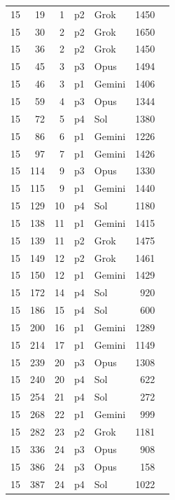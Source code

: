 \begin{longtable}{r r r l l r L{2.3in}}
15 & 19 & 1 & p2 & Grok & 1450 &  \\
15 & 30 & 2 & p2 & Grok & 1650 &  \\
15 & 36 & 2 & p2 & Grok & 1450 &  \\
15 & 45 & 3 & p3 & Opus & 1494 &  \\
15 & 46 & 3 & p1 & Gemini & 1406 &  \\
15 & 59 & 4 & p3 & Opus & 1344 &  \\
15 & 72 & 5 & p4 & Sol & 1380 &  \\
15 & 86 & 6 & p1 & Gemini & 1226 &  \\
15 & 97 & 7 & p1 & Gemini & 1426 &  \\
15 & 114 & 9 & p3 & Opus & 1330 &  \\
15 & 115 & 9 & p1 & Gemini & 1440 &  \\
15 & 129 & 10 & p4 & Sol & 1180 &  \\
15 & 138 & 11 & p1 & Gemini & 1415 &  \\
15 & 139 & 11 & p2 & Grok & 1475 &  \\
15 & 149 & 12 & p2 & Grok & 1461 &  \\
15 & 150 & 12 & p1 & Gemini & 1429 &  \\
15 & 172 & 14 & p4 & Sol & 920 &  \\
15 & 186 & 15 & p4 & Sol & 600 &  \\
15 & 200 & 16 & p1 & Gemini & 1289 &  \\
15 & 214 & 17 & p1 & Gemini & 1149 &  \\
15 & 239 & 20 & p3 & Opus & 1308 &  \\
15 & 240 & 20 & p4 & Sol & 622 &  \\
15 & 254 & 21 & p4 & Sol & 272 &  \\
15 & 268 & 22 & p1 & Gemini & 999 &  \\
15 & 282 & 23 & p2 & Grok & 1181 &  \\
15 & 336 & 24 & p3 & Opus & 908 &  \\
15 & 386 & 24 & p3 & Opus & 158 &  \\
15 & 387 & 24 & p4 & Sol & 1022 &  \\

\end{longtable}
